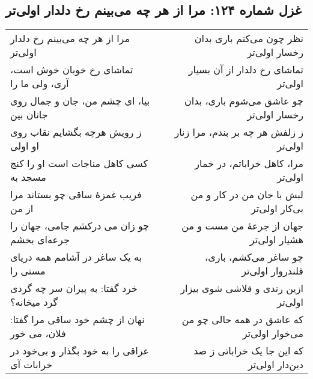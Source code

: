 \begin{center}
\section*{غزل شماره ۱۲۴: مرا از هر چه می‌بینم رخ دلدار اولی‌تر}
\label{sec:124}
\begin{longtable}{l p{0.5cm} r}
مرا از هر چه می‌بینم رخ دلدار اولی‌تر
&&
نظر چون می‌کنم باری بدان رخسار اولی‌تر
\\
تماشای رخ خوبان خوش است، آری، ولی ما را
&&
تماشای رخ دلدار از آن بسیار اولی‌تر
\\
بیا، ای چشم من، جان و جمال روی جانان بین
&&
چو عاشق می‌شوم باری، بدان رخسار اولی‌تر
\\
ز رویش هرچه بگشایم نقاب روی او اولی
&&
ز زلفش هر چه بر بندم، مرا زنار اولی‌تر
\\
کسی کاهل مناجات است او را کنج مسجد به
&&
مرا، کاهل خراباتم، در خمار اولی‌تر
\\
فریب غمزهٔ ساقی چو بستاند مرا از من
&&
لبش با جان من در کار و من بی‌کار اولی‌تر
\\
چو زان می درکشم جامی، جهان را جرعه‌ای بخشم
&&
جهان از جرعهٔ من مست و من هشیار اولی‌تر
\\
به یک ساغر در آشامم همه دریای مستی را
&&
چو ساغر می‌کشم، باری، قلندروار اولی‌تر
\\
خرد گفتا: به پیران سر چه گردی گرد میخانه؟
&&
ازین رندی و قلاشی شوی بیزار اولی‌تر
\\
نهان از چشم خود ساقی مرا گفتا: فلان، می خور
&&
که عاشق در همه حالی چو من می‌خوار اولی‌تر
\\
عراقی را به خود بگذار و بی‌خود در خرابات آی
&&
که این جا یک خراباتی ز صد دین‌دار اولی‌تر
\\
\end{longtable}
\end{center}
